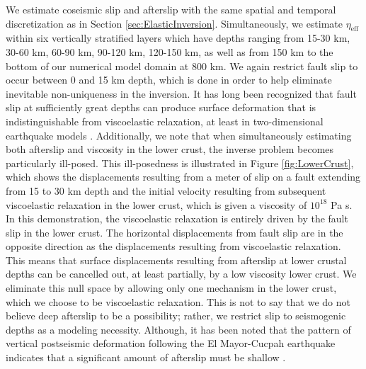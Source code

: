 \documentclass[draft,linenumbers]{AGUJournal}
\begin{document}
We estimate coseismic slip and afterslip with the same spatial and temporal discretization as in Section \ref{sec:ElasticInversion}. Simultaneously, we estimate $\eta_{\mathrm{eff}}$ within six vertically stratified layers which have depths ranging from 15-30 km, 30-60 km, 60-90 km, 90-120 km, 120-150 km, as well as from 150 km to the bottom of our numerical model domain at 800 km.  We again restrict fault slip to occur between 0 and 15 km depth, which is done in order to help eliminate inevitable non-uniqueness in the inversion.  It has long been recognized that fault slip at sufficiently great depths can produce surface deformation that is indistinguishable from viscoelastic relaxation, at least in two-dimensional earthquake models \citep{Savage1990}.  Additionally, we note that when simultaneously estimating both afterslip and viscosity in the lower crust, the inverse problem becomes particularly ill-posed. This ill-posedness is illustrated in Figure \ref{fig:LowerCrust}, which shows the displacements resulting from a meter of slip on a fault extending from 15 to 30 km depth and the initial velocity resulting from subsequent viscoelastic relaxation in the lower crust, which is given a viscosity of $10^{18}$ Pa s.  In this demonstration, the viscoelastic relaxation is entirely driven by the fault slip in the lower crust.  The horizontal displacements from fault slip are in the opposite direction as the displacements resulting from viscoelastic relaxation.  This means that surface displacements resulting from afterslip at lower crustal depths can be cancelled out, at least partially, by a low viscosity lower crust.  We eliminate this null space by allowing only one mechanism in the lower crust, which we choose to be viscoelastic relaxation.  This is not to say that we do not believe deep afterslip to be a possibility; rather, we restrict slip to seismogenic depths as a modeling necessity. Although, it has been noted that the pattern of vertical postseismic deformation following the El Mayor-Cucpah earthquake indicates that a significant amount of afterslip must be shallow \citep{Rollins2015}.  
 
\end{document}
